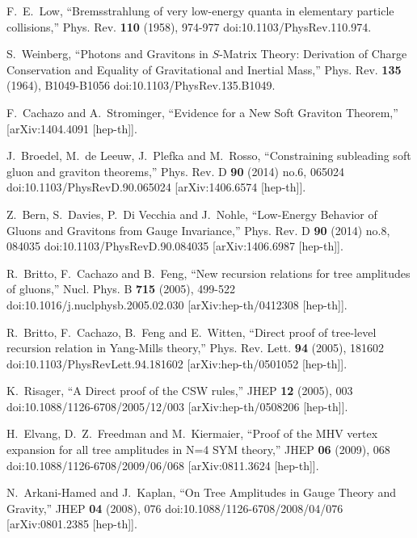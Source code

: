 F.~E.~Low,
``Bremsstrahlung of very low-energy quanta in elementary particle collisions,''
Phys. Rev. \textbf{110} (1958), 974-977
doi:10.1103/PhysRev.110.974.

S.~Weinberg,
``Photons and Gravitons in  $S$-Matrix Theory: Derivation of Charge Conservation and Equality of Gravitational and Inertial Mass,''
Phys. Rev. \textbf{135} (1964), B1049-B1056
doi:10.1103/PhysRev.135.B1049.

F.~Cachazo and A.~Strominger,
``Evidence for a New Soft Graviton Theorem,''
[arXiv:1404.4091 [hep-th]].

J.~Broedel, M.~de Leeuw, J.~Plefka and M.~Rosso,
``Constraining subleading soft gluon and graviton theorems,''
Phys. Rev. D \textbf{90} (2014) no.6, 065024
doi:10.1103/PhysRevD.90.065024
[arXiv:1406.6574 [hep-th]].

Z.~Bern, S.~Davies, P.~Di Vecchia and J.~Nohle,
``Low-Energy Behavior of Gluons and Gravitons from Gauge Invariance,''
Phys. Rev. D \textbf{90} (2014) no.8, 084035
doi:10.1103/PhysRevD.90.084035
[arXiv:1406.6987 [hep-th]].

R.~Britto, F.~Cachazo and B.~Feng,
``New recursion relations for tree amplitudes of gluons,''
Nucl. Phys. B \textbf{715} (2005), 499-522
doi:10.1016/j.nuclphysb.2005.02.030
[arXiv:hep-th/0412308 [hep-th]].

R.~Britto, F.~Cachazo, B.~Feng and E.~Witten,
``Direct proof of tree-level recursion relation in Yang-Mills theory,''
Phys. Rev. Lett. \textbf{94} (2005), 181602
doi:10.1103/PhysRevLett.94.181602
[arXiv:hep-th/0501052 [hep-th]].

K.~Risager,
``A Direct proof of the CSW rules,''
JHEP \textbf{12} (2005), 003
doi:10.1088/1126-6708/2005/12/003
[arXiv:hep-th/0508206 [hep-th]].

H.~Elvang, D.~Z.~Freedman and M.~Kiermaier,
``Proof of the MHV vertex expansion for all tree amplitudes in N=4 SYM theory,''
JHEP \textbf{06} (2009), 068
doi:10.1088/1126-6708/2009/06/068
[arXiv:0811.3624 [hep-th]].

N.~Arkani-Hamed and J.~Kaplan,
``On Tree Amplitudes in Gauge Theory and Gravity,''
JHEP \textbf{04} (2008), 076
doi:10.1088/1126-6708/2008/04/076
[arXiv:0801.2385 [hep-th]].

